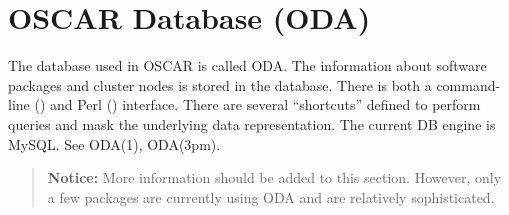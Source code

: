 

\section{OSCAR Database (ODA)}
\label{sect:oda}

The database used in OSCAR is called ODA.  The information about software
packages and cluster nodes is stored in the database.  There is both a
command-line () and Perl () interface.  There are several
``shortcuts'' defined to perform queries and mask the underlying data
representation.  The current DB engine is MySQL.  See ODA(1), ODA(3pm).

\begin{verse}
    {\bfseries Notice:} More information should be added to this section.
	However, only a few packages are currently using ODA and are relatively
	sophisticated.
\end{verse}
